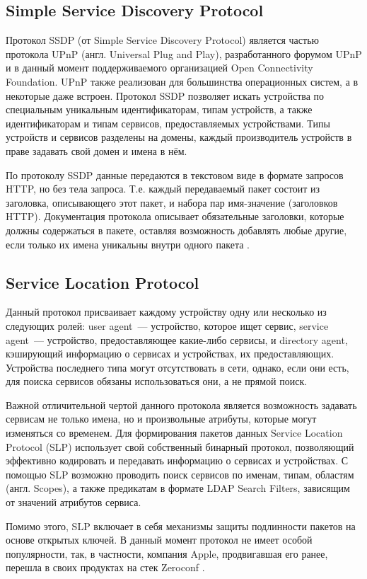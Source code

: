 \subsection{Simple Service Discovery Protocol}
Протокол SSDP (от Simple Service Discovery Protocol) является частью протокола UPnP (англ. Universal Plug and Play), разработанного форумом UPnP и в данный момент поддерживаемого организацией Open Connectivity Foundation.
UPnP также реализован для большинства операционных систем, а в некоторые даже встроен.
Протокол SSDP позволяет искать устройства по специальным уникальным идентификаторам, типам устройств, а также идентификаторам и типам сервисов, предоставляемых устройствами.
Типы устройств и сервисов разделены на домены, каждый производитель устройств в праве задавать свой домен и имена в нём.

По протоколу SSDP данные передаются в текстовом виде в формате запросов HTTP, но без тела запроса.
Т.е. каждый передаваемый пакет состоит из заголовка, описывающего этот пакет, и набора пар имя-значение (заголовков HTTP).
Документация протокола описывает обязательные заголовки, которые должны содержаться в пакете, оставляя возможность добавлять любые другие, если только их имена уникальны внутри одного пакета \cite{web:upnp}.

\subsection{Service Location Protocol}
Данный протокол присваивает каждому устройству одну или несколько из следующих ролей: user agent~--- устройство, которое ищет сервис, service agent~--- устройство, предоставляющее какие-либо сервисы, и directory agent, кэширующий информацию о сервисах и устройствах, их предоставляющих.
Устройства последнего типа могут отсутствовать в сети, однако, если они есть, для поиска сервисов обязаны использоваться они, а не прямой поиск.

Важной отличительной чертой данного протокола является возможность задавать сервисам не только имена, но и произвольные атрибуты, которые могут изменяться со временем.
Для формирования пакетов данных Service Location Protocol (SLP) использует свой собственный бинарный протокол, позволяющий эффективно кодировать и передавать информацию о сервисах и устройствах.
С помощью SLP возможно проводить поиск сервисов по именам, типам, областям (англ. Scopes), а также предикатам в формате LDAP Search Filters, зависящим от значений атрибутов сервиса.

Помимо этого, SLP включает в себя механизмы защиты подлинности пакетов на основе открытых ключей.
В данный момент протокол не имеет особой популярности, так, в частности, компания Apple, продвигавшая его ранее, перешла в своих продуктах на стек Zeroconf \cite{web:slp}.

